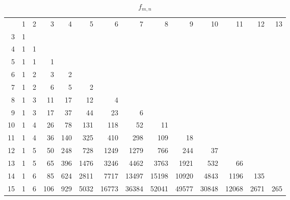 \documentclass[10pt]{amsart}
\begin{document}
    \begin{table}[h]
    {\scriptsize \begin{tabular}{|r|rrrrrrrrrrrrr|} \hline
    & 1 & 2 & 3 & 4 & 5 & 6 & 7 & 8 & 9 & 10 & 11 & 12 & 13 \\
    3 & 1 &&&&&&&&&&&& \\
    4 & 1 & 1 &&&&&&&&&&& \\
    5 & 1 & 1 & 1 &&&&&&&&&& \\
    6 & 1 & 2 & 3 & 2 &&&&&&&&& \\
    7 & 1 & 2 & 6 & 5 & 2 &&&&&&&& \\
    8 & 1 & 3 & 11 & 17 & 12 & 4 &&&&&&& \\
    9 & 1 & 3 & 17 & 37 & 44 & 23 & 6 &&&&&& \\
    10 & 1 & 4 & 26 & 78 & 131 & 118 & 52 & 11 &&&&& \\
    11 & 1 & 4 & 36 & 140 & 325 & 410 & 298 & 109 & 18 &&&& \\
    12 & 1 & 5 & 50 & 248 & 728 & 1249 & 1279 & 766  & 244 & 37 &&& \\
    13 & 1 & 5 & 65 & 396 & 1476 & 3246 & 4462 & 3763 & 1921 &  532 & 66 && \\
    14 & 1 & 6 & 85 & 624 & 2811 &  7717 & 13497 & 15198 & 10920 & 4843 & 1196 & 135 & \\
    15 & 1 & 6 & 106 & 929 & 5032 & 16773 & 36384 & 52041 & 49577 & 30848 & 12068 & 2671 & 265 \\
    \hline
    \end{tabular}}
    \vspace{.2cm}
    \caption{$f_{m,n}$}
    \label{f-mn}
    \end{table}
    
    \clearpage
    
    
\end{document}
